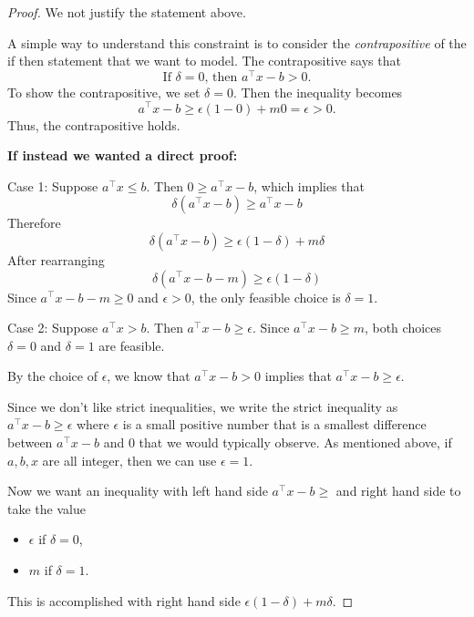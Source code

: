 \begin{proof}We not justify the statement above.

A simple way to understand this constraint is to consider the \emph{contrapositive} of the if then statement that we want to model.  The contrapositive says that 
\begin{equation}
\text{If $\delta = 0$, then $a^\top x - b > 0$.}
\end{equation}
To show the contrapositive, we set $\delta = 0$.  Then the inequality becomes 
$$
a^\top x - b \geq \epsilon(1-0) + m0 = \epsilon > 0.
$$
Thus, the contrapositive holds.

\textbf{If instead we wanted a direct proof:}

Case 1: Suppose $a^\top x \leq b$.  Then $0 \geq a^\top x - b$, which implies that 
$$
\delta(a^\top x - b) \geq a^\top x - b
$$
Therefore
$$
\delta(a^\top x - b) \geq \epsilon(1-\delta) + m \delta
$$
After rearranging
$$
\delta(a^\top x - b - m) \geq \epsilon(1-\delta)
$$
Since $a^\top x - b - m \geq 0$ and $\epsilon > 0$, the only feasible choice is $\delta = 1$.

Case 2:  Suppose $a^\top x > b$.  Then $a^\top x - b \geq \epsilon$.    Since $a^\top x -b \geq m$, both choices $\delta = 0$ and $\delta = 1$ are feasible.

By the choice of $\epsilon$,  we know that $a^\top x -b > 0$ implies that $a^\top x - b \geq \epsilon$.  

Since we don't like strict inequalities, we write the strict inequality as $a^\top x - b \geq \epsilon$ where $\epsilon$ is a small positive number that is a smallest difference between $a^\top x - b$ and $0$ that we would typically observe.  As mentioned above, if $a,b,x$ are all integer, then we can use $\epsilon = 1$.

Now we want an inequality with left hand side $a^\top x - b \geq$ and right hand side to take the value 
\begin{itemize}
\item $\epsilon$ if $\delta = 0$,
\item $m$ if $\delta = 1$.
\end{itemize}
This is accomplished with right hand side $\epsilon (1-\delta) + m\delta$.
\end{proof}

